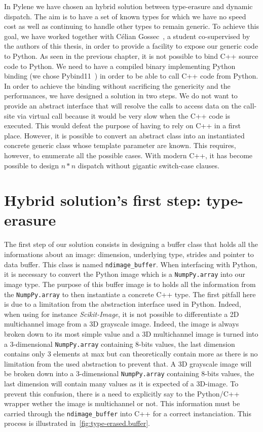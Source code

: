 In Pylene we have chosen an hybrid solution between type-erasure and dynamic dispatch. The aim is to have a set of known
types for which we have no speed cost as well as continuing to handle other types to remain generic. To achieve this
goal, we have worked together with Célian Gossec~\cite{gossec.2019.pybind}, a student co-supervised by the authors of
this thesis, in order to provide a facility to expose our generic code to Python. As seen in the previous chapter, it is
not possible to bind C++ source code to Python. We need to have a compiled binary implementing Python binding (we chose
Pybind11~\parencite{jakob.2017.pybind11}) in order to be able to call C++ code from Python. In order to achieve the
binding without sacrificing the genericity and the performances, we have designed a solution in two steps. We do not
want to provide an abstract interface that will resolve the calls to access data on the call-site via virtual call
because it would be very slow when the C++ code is executed. This would defeat the purpose of having to rely on C++ in a
first place. However, it is possible to convert an abstract class into an instantiated concrete generic class whose
template parameter are known. This requires, however, to enumerate all the possible cases. With modern C++, it has
become possible to design $n*n$ dispatch without gigantic switch-case clauses.


\section{Hybrid solution's first step: type-erasure}

The first step of our solution consists in designing a buffer class that holds all the informations about an image:
dimension, underlying type, strides and pointer to data buffer. This class is named \texttt{ndimage\_buffer}. When
interfacing with Python, it is necessary to convert the Python image which is a \texttt{NumpPy.array} into our image
type. The purpose of this buffer image is to holds all the information from the \texttt{NumpPy.array} to then
instantiate a concrete C++ type. The first pitfall here is due to a limitation from the abstraction interface used in
Python. Indeed, when using for instance \emph{Scikit-Image}, it is not possible to differentiate a 2D multichannel image
from a 3D grayscale image. Indeed, the image is always broken down to its most simple value and a 3D multichannel image
is turned into a 3-dimensional \texttt{NumpPy.array} containing 8-bits values, the last dimension contains only 3
elements at max but can theoretically contain more as there is no limitation from the used abstraction to prevent that.
A 3D grayscale image will be broken down into a 3-dimensional \texttt{NumpPy.array} containing 8-bits values, the last
dimension will contain many values as it is expected of a 3D-image. To prevent this confusion, there is a need to
explicitly say to the Python/C++ wrapper wether the image is multichannel or not. This information must be carried
through the \texttt{ndimage\_buffer} into C++ for a correct instanciation. This process is illustrated
in~\cref{fig:type-erased.buffer}.

